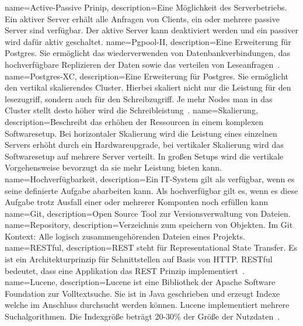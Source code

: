 {
  name=Active-Passive Prinip,
  description={Eine Möglichkeit des Serverbetriebs. Ein aktiver Server erhält
               alle Anfragen von Clients, ein oder mehrere passive Server sind
               verfügbar. Der aktive Server kann deaktiviert werden und ein
               passiver wird dafür aktiv geschaltet.}
}
{
  name=Pgpool-II,
  description={Eine Erweiterung für Postgres. Sie ermöglicht das wiederverwenden
               von Datenbankverbindungen, das hochverfügbare Replizieren der
               Daten sowie das verteilen von Leseanfragen~\cite{pgpool}.}
}
{
  name=Postgres-XC,
  description={Eine Erweiterung für Postgres. Sie ermöglicht den vertikal
               skalierendes Cluster. Hierbei skaliert nicht nur die Leistung
               für den lesezugriff, sondern auch für den Schreibzugriff. Je
               mehr Nodes man in das Cluster stellt desto höher wird die
               Schreibleistung~\cite{postgres-xc}.}
}
{
  name=Skalierung,
  description={Beschreibt das erhöhen der Ressourcen in einem komplexen
               Softwaresetup. Bei horizontaler Skalierung wird die Leistung
               eines einzelnen Servers erhöht durch ein Hardwareupgrade,
               bei vertikaler Skalierung wird das Softwaresetup auf mehrere
               Server verteilt. In großen Setups wird die vertikale
               Vorgehensweise bevorzugt da sie mehr Leistung bieten kann.}
}
{
  name=Hochverfügbarkeit,
  description={Ein IT-System gilt als verfügbar, wenn es seine definierte
               Aufgabe abarbeiten kann. Als hochverfügbar gilt es, wenn es
               diese Aufgabe trotz Ausfall einer oder mehrerer Komponten noch
               erfüllen kann}
}
{
  name=Git,
  description={Open Source Tool zur Versionsverwaltung von Dateien.}
}
{
  name=Repository,
  description={Verzeichnis zum speichern von Objekten. Im Git Kontext: Alle
               logisch zusammengehörenden Dateien eines Projekts.}
}
{
  name=RESTful,
  description={REST steht für Representational State Transfer. Es ist ein
               Architekturprinzip für Schnittstellen auf Basis von HTTP.
               RESTful bedeutet, dass eine Applikation das REST Prinzip
               implementiert~\cite{fielding2000architectural}.}
}
{
  name=Lucene,
  description={Lucene ist eine Bibliothek der Apache Software Foundation zur
               Volltextsuche. Sie ist in Java geschrieben und erzeugt Indexe
               welche im Anschluss durchsucht werden können. Lucene
               implementiert mehrere Suchalgorithmen. Die Indexgröße beträgt
               20-30\% der Größe der Nutzdaten~\cite{lucene_features}.}
}

